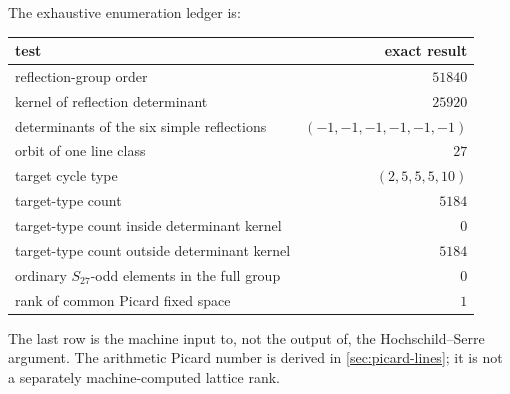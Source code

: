 The exhaustive enumeration ledger is:
\begin{center}
\begin{tabular}{@{}lr@{}}
\toprule
test & exact result\\
\midrule
reflection-group order & \(51840\)\\
kernel of reflection determinant & \(25920\)\\
determinants of the six simple reflections & \((-1,-1,-1,-1,-1,-1)\)\\
orbit of one line class & \(27\)\\
target cycle type & \((2,5,5,5,10)\)\\
target-type count & \(5184\)\\
target-type count inside determinant kernel & \(0\)\\
target-type count outside determinant kernel & \(5184\)\\
ordinary \(S_{27}\)-odd elements in the full group & \(0\)\\
rank of common Picard fixed space & \(1\)\\
\bottomrule
\end{tabular}
\end{center}

The last row is the machine input to, not the output of, the
Hochschild--Serre argument.  The arithmetic Picard number is derived in
\cref{sec:picard-lines}; it is not a separately machine-computed lattice
rank.
